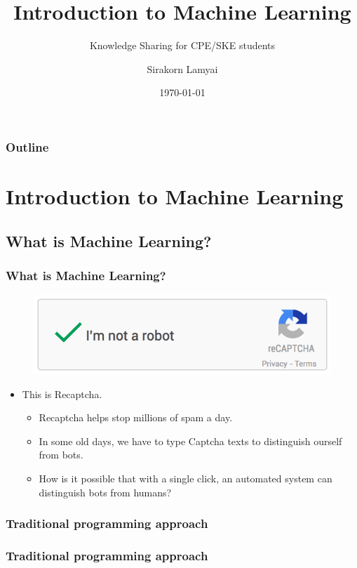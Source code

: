 \documentclass[]{beamer}
\title{Introduction to Machine Learning}
\subtitle{Knowledge Sharing for CPE/SKE students}
\author{Sirakorn Lamyai}
\institute{Student, Kasetsart U.}
\date{\today}
\begin{document}
\begin{frame}
\titlepage
\end{frame}

\begin{frame}
\frametitle{Outline}
\tableofcontents
\end{frame}

\section{Introduction to Machine Learning}

\subsection{What is Machine Learning?}

\begin{frame}
\frametitle{What is Machine Learning?}
\pause
\begin{figure}
\includegraphics[scale=1]{imgs/recaptcha.png}
\end{figure}
\begin{itemize}
\pause
\item This is Recaptcha.
\begin{itemize}
\pause
\item Recaptcha helps stop millions of spam a day.
\pause
\item In some old days, we have to type Captcha texts to distinguish ourself from bots.
\pause
\item How is it possible that with a single click, an automated system can distinguish bots from humans?
\end{itemize}
\end{itemize}
\end{frame}

\subsubsection{Traditional programming approach}

\begin{frame}
\frametitle{Traditional programming approach}
\begin{center}
\end{center}
\end{frame}
\end{document}
